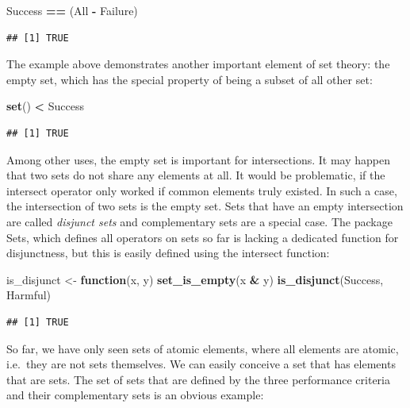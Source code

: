 \documentclass[]{svmono}
\newenvironment{Shaded}{\begin{snugshade}}{\end{snugshade}}
\newcommand{\KeywordTok}[1]{\textcolor[rgb]{0.13,0.29,0.53}{\textbf{#1}}}
\newcommand{\StringTok}[1]{\textcolor[rgb]{0.31,0.60,0.02}{#1}}
\newcommand{\ControlFlowTok}[1]{\textcolor[rgb]{0.13,0.29,0.53}{\textbf{#1}}}
\newcommand{\OperatorTok}[1]{\textcolor[rgb]{0.81,0.36,0.00}{\textbf{#1}}}
\newcommand{\NormalTok}[1]{#1}
\theoremstyle{definition}
\theoremstyle{definition}
\theoremstyle{definition}
\theoremstyle{remark}
\begin{document}
\begin{Shaded}
\begin{Highlighting}[]
\NormalTok{Success }\OperatorTok{==}\StringTok{ }\NormalTok{(All }\OperatorTok{-}\StringTok{ }\NormalTok{Failure)}
\end{Highlighting}
\end{Shaded}

\begin{verbatim}
## [1] TRUE
\end{verbatim}

The example above demonstrates another important element of set theory:
the empty set, which has the special property of being a subset of all
other set:

\begin{Shaded}
\begin{Highlighting}[]
\KeywordTok{set}\NormalTok{() }\OperatorTok{<}\StringTok{ }\NormalTok{Success}
\end{Highlighting}
\end{Shaded}

\begin{verbatim}
## [1] TRUE
\end{verbatim}

Among other uses, the empty set is important for intersections. It may
happen that two sets do not share any elements at all. It would be
problematic, if the intersect operator only worked if common elements
truly existed. In such a case, the intersection of two sets is the empty
set. Sets that have an empty intersection are called \emph{disjunct
sets} and complementary sets are a special case. The package Sets, which
defines all operators on sets so far is lacking a dedicated function for
disjunctness, but this is easily defined using the intersect function:

\begin{Shaded}
\begin{Highlighting}[]
\NormalTok{is_disjunct <-}\StringTok{ }\ControlFlowTok{function}\NormalTok{(x, y) }\KeywordTok{set_is_empty}\NormalTok{(x }\OperatorTok{&}\StringTok{ }\NormalTok{y)}
\KeywordTok{is_disjunct}\NormalTok{(Success, Harmful)}
\end{Highlighting}
\end{Shaded}

\begin{verbatim}
## [1] TRUE
\end{verbatim}

So far, we have only seen sets of atomic elements, where all elements
are atomic, i.e.~they are not sets themselves. We can easily conceive a
set that has elements that are sets. The set of sets that are defined by
the three performance criteria and their complementary sets is an
obvious example:
\end{document}
